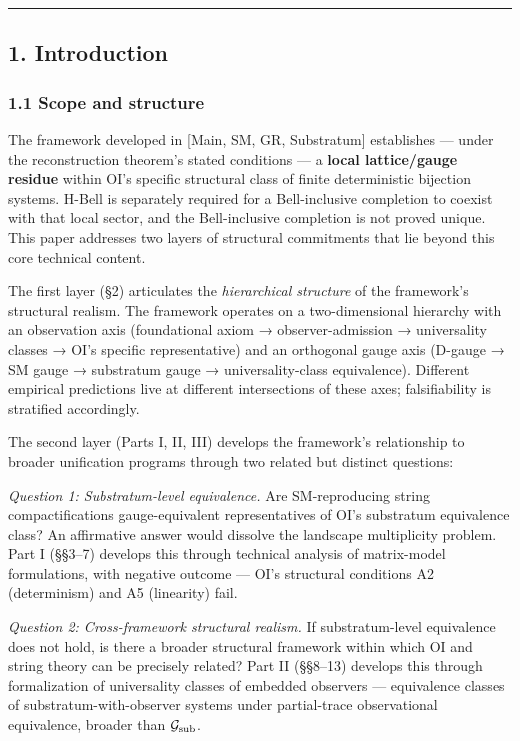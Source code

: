 \documentclass[
]{article}
\begin{document}
\begin{center}\rule{0.5\linewidth}{0.5pt}\end{center}

\hypertarget{introduction}{%
\subsection{1. Introduction}\label{introduction}}

\hypertarget{scope-and-structure}{%
\subsubsection{1.1 Scope and structure}\label{scope-and-structure}}

The framework developed in {[}Main, SM, GR, Substratum{]} establishes
--- under the reconstruction theorem's stated conditions --- a
\textbf{local lattice/gauge residue} within OI's specific structural
class of finite deterministic bijection systems. H-Bell is separately
required for a Bell-inclusive completion to coexist with that local
sector, and the Bell-inclusive completion is not proved unique. This
paper addresses two layers of structural commitments that lie beyond
this core technical content.

The first layer (§2) articulates the \emph{hierarchical structure} of
the framework's structural realism. The framework operates on a
two-dimensional hierarchy with an observation axis (foundational axiom →
observer-admission → universality classes → OI's specific
representative) and an orthogonal gauge axis (D-gauge → SM gauge →
substratum gauge → universality-class equivalence). Different empirical
predictions live at different intersections of these axes;
falsifiability is stratified accordingly.

The second layer (Parts I, II, III) develops the framework's
relationship to broader unification programs through two related but
distinct questions:

\emph{Question 1: Substratum-level equivalence.} Are SM-reproducing
string compactifications gauge-equivalent representatives of OI's
substratum equivalence class? An affirmative answer would dissolve the
landscape multiplicity problem. Part I (§§3--7) develops this through
technical analysis of matrix-model formulations, with negative outcome
--- OI's structural conditions A2 (determinism) and A5 (linearity) fail.

\emph{Question 2: Cross-framework structural realism.} If
substratum-level equivalence does not hold, is there a broader
structural framework within which OI and string theory can be precisely
related? Part II (§§8--13) develops this through formalization of
universality classes of embedded observers --- equivalence classes of
substratum-with-observer systems under partial-trace observational
equivalence, broader than \(\mathcal{G}_{\rm sub}\).
\end{document}
